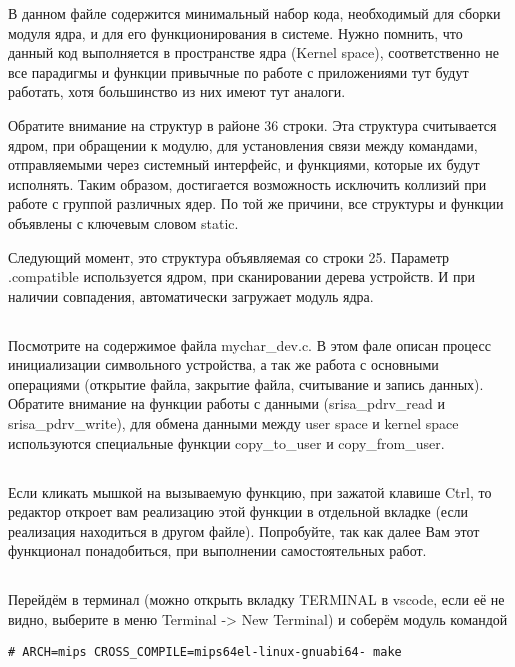 В данном файле содержится минимальный набор кода, необходимый для сборки модуля ядра, и для его функционирования в системе. Нужно помнить, что данный код выполняется в пространстве ядра (Kernel space), соответственно не все парадигмы и функции привычные по работе с приложениями тут будут работать, хотя большинство из них имеют тут аналоги.

Обратите внимание на структур в районе 36 строки. Эта структура считывается ядром, при обращении к модулю, для установления связи между командами, отправляемыми через системный интерфейс, и функциями, которые их будут исполнять. Таким образом, достигается возможность исключить коллизий при работе с группой различных ядер. По той же причини, все структуры и функции объявлены с ключевым словом static.

Следующий момент, это структура объявляемая со строки 25. Параметр .compatible используется ядром, при сканировании дерева устройств. И при наличии совпадения, автоматически загружает модуль ядра.  


\subsection{}Посмотрите на содержимое файла mychar\_dev.c. В этом фале описан процесс инициализации символьного устройства, а так же работа с основными операциями (открытие файла, закрытие файла, считывание и запись данных).
Обратите внимание на функции работы с данными (srisa\_pdrv\_read и srisa\_pdrv\_write), для обмена данными между user space и kernel space используются специальные функции copy\_to\_user и copy\_from\_user.

\subsection{}Если кликать мышкой на вызываемую функцию, при зажатой клавише Ctrl, то редактор откроет вам реализацию этой функции в отдельной вкладке (если реализация находиться в другом файле). Попробуйте, так как далее Вам этот функционал понадобиться, при выполнении самостоятельных работ.

\subsection{}Перейдём в терминал (можно открыть вкладку TERMINAL в vscode, если её не видно, выберите в меню Terminal -> New Terminal) и соберём модуль командой
\begin{lstlisting}[style=bash]
# ARCH=mips CROSS_COMPILE=mips64el-linux-gnuabi64- make
\end{lstlisting}

